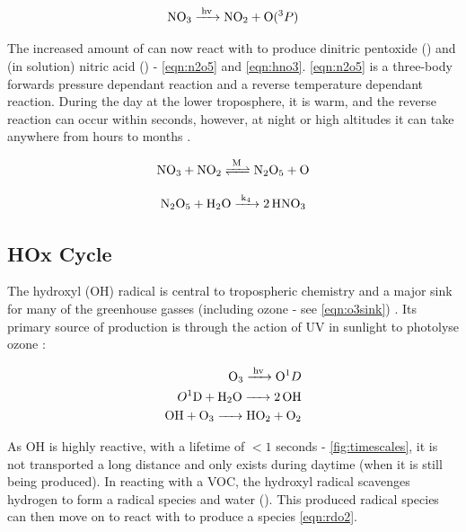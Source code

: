 \begin{equation}
  \ce{NO3 ->[hv] NO2 + O}(^3P)
  \label{eqn:nno3}
\end{equation}


 The increased amount of  can now react with  to produce dinitric pentoxide () and (in solution) nitric acid () - \autoref{eqn:n2o5} and \autoref{eqn:hno3}. \autoref{eqn:n2o5} is a three-body forwards pressure dependant reaction and a reverse temperature dependant reaction. During the day at the lower troposphere, it is warm, and the reverse reaction can occur within seconds, however, at night or high altitudes it can take anywhere from hours to months \citep{fundamentals}.


\begin{equation}
  \ce{NO3 + NO2 <=>[M] N2O5 + O}
  \label{eqn:n2o5}
\end{equation}

\begin{equation}
  \ce{N2O5 + H2O ->[k4] 2HNO3}
  \label{eqn:hno3}
\end{equation}



\subsection{HOx Cycle}
The hydroxyl (OH) radical is central to tropospheric chemistry and a major sink for many of the greenhouse gasses (including ozone - see \autoref{eqn:o3sink}) \citep{olson}. Its primary source of production is through the action of UV in sunlight to photolyse ozone \citep{fundamentals}:

\begin{align}
  \ce{O3 ->[hv] O}^1D\\
  O^1\ce{D + H2O -> 2OH}\\
  \ce{OH + O3 -> HO2 + O2} \label{eqn:o3sink}
\end{align}

As OH is highly reactive, with a lifetime of $<1$ seconds - \autoref{fig:timescales}, it is not transported a long distance and only exists during daytime (when it is still being produced). In reacting with a VOC, the hydroxyl radical scavenges hydrogen to form a radical species and water (). This produced radical species can then move on to react with  to produce a  species \autoref{eqn:rdo2}.%






